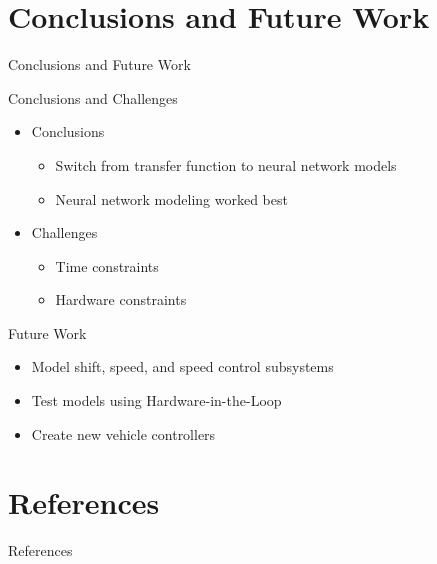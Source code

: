 \documentclass{beamer}
\begin{document}

\section{Conclusions and Future Work}

\begin{frame}{Conclusions and Future Work}
  \begin{block}{Conclusions and Challenges}
    \begin{itemize}
      \item Conclusions
      \begin{itemize}
      	\item Switch from transfer function to neural network models
      	\item Neural network modeling worked best 
      \end{itemize}
      \item Challenges
        \begin{itemize}
      	\item Time constraints 
      	\item Hardware constraints 
      \end{itemize}
    \end{itemize}
  \end{block}
  \begin{block}{Future Work}
    \begin{itemize}
    	  \item Model shift, speed, and speed control subsystems
      \item Test models using Hardware-in-the-Loop
      \item Create new vehicle controllers 
    \end{itemize}
  \end{block}
\end{frame}


\section{References}

\begin{frame}[allowframebreaks]{References}
  
  
\end{frame}

\end{document}
